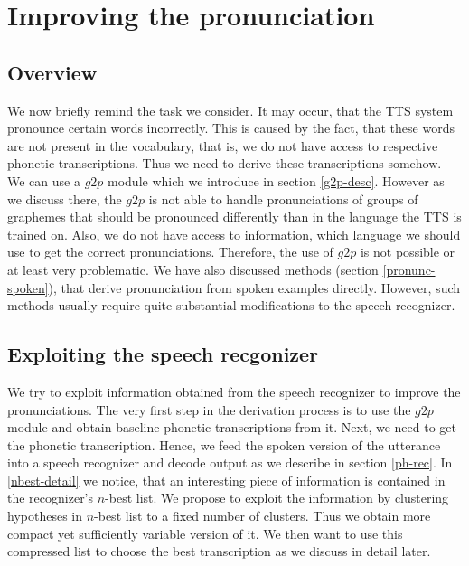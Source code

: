 \section{Improving the pronunciation}
\label{pron-improvement}
\subsection{Overview}
We now briefly remind the task we consider.
It may occur, that the TTS system pronounce certain words incorrectly.
This is caused by the fact, that these words are not present in the vocabulary, that is, we do not have access to respective phonetic transcriptions.
Thus we need to derive these transcriptions somehow.
We can use a $g2p$ module which we introduce in section \ref{g2p-desc}.
However as we discuss there, the $g2p$ is not able to handle pronunciations of groups of graphemes that should be pronounced differently than in the language the TTS is trained on.
Also, we do not have access to information, which language we should use to get the correct pronunciations.
Therefore, the use of $g2p$ is not possible or at least very problematic.
We have also discussed methods (section \ref{pronunc-spoken}), that derive pronunciation from spoken examples directly.
However, such methods usually require quite substantial modifications to the speech recognizer.
\subsection{Exploiting the speech recgonizer}
We try to exploit information obtained from the speech recognizer to improve the pronunciations.
The very first step in the derivation process is to use the $g2p$ module and obtain baseline phonetic transcriptions from it.
Next, we need to get the phonetic transcription.
Hence, we feed the spoken version of the utterance into a speech recognizer and decode output as we describe in section \ref{ph-rec}.
In \ref{nbest-detail} we notice, that an interesting piece of information is contained in the  recognizer's $n$-best list.
We propose to exploit the information by clustering hypotheses in $n$-best list to a fixed number of clusters.
Thus we obtain more compact yet sufficiently variable version of it.
We then want to use this compressed list to choose the best transcription as we discuss in detail later.
